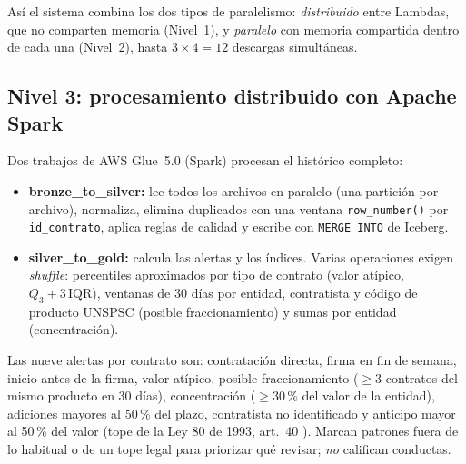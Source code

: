 \documentclass[conference]{IEEEtran}
\begin{document}
Así el sistema combina los dos tipos de paralelismo: \emph{distribuido} entre Lambdas, que no comparten memoria (Nivel~1), y \emph{paralelo} con memoria compartida dentro de cada una (Nivel~2), hasta $3 \times 4 = 12$ descargas simultáneas.

\subsection{Nivel 3: procesamiento distribuido con Apache Spark}
Dos trabajos de AWS Glue~5.0 (Spark) procesan el histórico completo:
\begin{itemize}
  \item \textbf{bronze\_to\_silver:} lee todos los archivos en paralelo (una partición por archivo), normaliza, elimina duplicados con una ventana \texttt{row\_number()} por \texttt{id\_contrato}, aplica reglas de calidad y escribe con \texttt{MERGE INTO} de Iceberg.
  \item \textbf{silver\_to\_gold:} calcula las alertas y los índices. Varias operaciones exigen \textit{shuffle}: percentiles aproximados por tipo de contrato (valor atípico, $Q_3 + 3\,\mathrm{IQR}$), ventanas de 30 días por entidad, contratista y código de producto UNSPSC (posible fraccionamiento) y sumas por entidad (concentración).
\end{itemize}

Las nueve alertas por contrato son: contratación directa, firma en fin de semana, inicio antes de la firma, valor atípico, posible fraccionamiento ($\geq 3$ contratos del mismo producto en 30 días), concentración ($\geq 30$\,\% del valor de la entidad), adiciones mayores al 50\,\% del plazo, contratista no identificado y anticipo mayor al 50\,\% del valor (tope de la Ley 80 de 1993, art.~40 \cite{ley80}). Marcan patrones fuera de lo habitual o de un tope legal para priorizar qué revisar; \emph{no} califican conductas.
\end{document}

